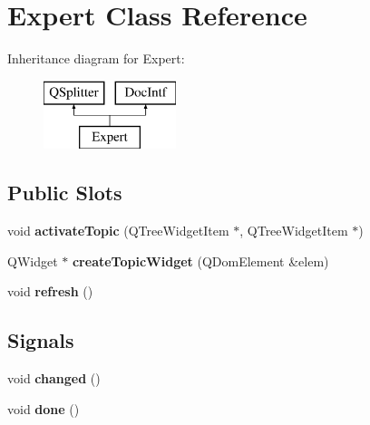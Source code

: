 \hypertarget{class_expert}{}\section{Expert Class Reference}
\label{class_expert}
Inheritance diagram for Expert\+:\begin{figure}[H]
\begin{center}
\leavevmode
\includegraphics[height=2.000000cm]{class_expert}
\end{center}
\end{figure}
\subsection*{Public Slots}
\begin{DoxyCompactItemize}
\item 
\mbox{\label{class_expert_a0f55cd028a8322d2d1f8afee0febe967}} 
void {\bfseries activate\+Topic} (Q\+Tree\+Widget\+Item $\ast$, Q\+Tree\+Widget\+Item $\ast$)
\item 
\mbox{\label{class_expert_a0c1669551833b56baf5241b1fe7b60ab}} 
Q\+Widget $\ast$ {\bfseries create\+Topic\+Widget} (Q\+Dom\+Element \&elem)
\item 
\mbox{\label{class_expert_a9d7ae3fd40cb983dbfda644207b252c0}} 
void {\bfseries refresh} ()
\end{DoxyCompactItemize}
\subsection*{Signals}
\begin{DoxyCompactItemize}
\item 
\mbox{\label{class_expert_adfdb3f64dfe39f00c6454db2763cdca3}} 
void {\bfseries changed} ()
\item 
\mbox{\label{class_expert_a4e4cb0780efed37a18d12610af419f67}} 
void {\bfseries done} ()
\end{DoxyCompactItemize}
